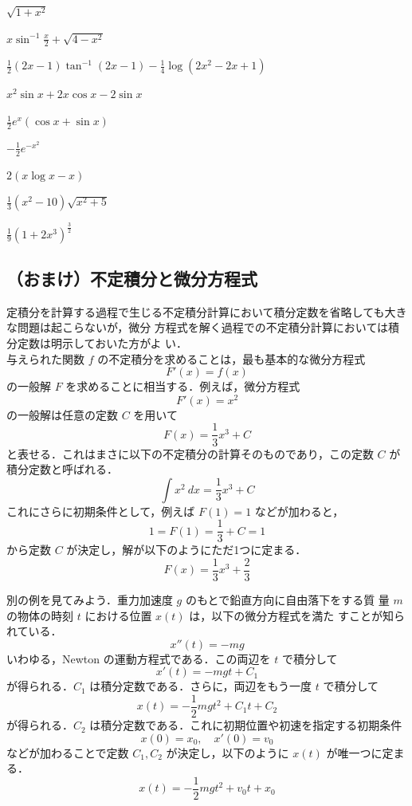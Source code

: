 \documentclass[10pt, uplatex, dvipdfmx]{jsarticle}
\theoremstyle{definition}
\numberwithin{equation}{section}
\newcommand{\ds}{\displaystyle}
\begin{document}
\begin{edaenumerate}
\item $\ds \sqrt{1+x^2}$

\item $\ds x\sin^{-1}\frac{x}{2} + \sqrt{4-x^2}$

\item<1> $\ds \frac{1}{2}\left(2x-1\right)\tan^{-1}\left(2x-1\right)-\frac{1}{4}\log \left(2x^2-2x+1\right)$ 

\item<2> $\ds x^2\sin x + 2x\cos x - 2 \sin x$

\item $\ds \frac{1}{2}e^x\left( \cos x + \sin x\right)$

\item $\ds -\frac{1}{2}e^{-x^2}$

\item $\ds 2 \left( x \log x - x\right)$

\item $\ds \frac{1}{3}\left(x^2-10 \right)\sqrt{x^2+5}$

\item $\ds \frac{1}{9} \left(1+2x^3\right)^{\frac{3}{2}}$

\end{edaenumerate}

\newpage

\subsection{（おまけ）不定積分と微分方程式}

定積分を計算する過程で生じる不定積分計算において積分定数を省略しても大きな問題は起こらないが，微分
方程式を解く過程での不定積分計算においては積分定数は明示しておいた方がよ
い．\\

与えられた関数 $f$ の不定積分を求めることは，最も基本的な微分方程式
\[
  F'(x) = f(x)
\]
の一般解 $F$ を求めることに相当する．例えば，微分方程式
\[
  F'(x) = x^2
\]
の一般解は任意の定数 $C$ を用いて
\[
  F(x) = \frac{1}{3}x^3 + C 
\]
と表せる．これはまさに以下の不定積分の計算そのものであり，この定数 $C$ が積分定数と呼ばれる．
\[
  \int x^2 \ dx = \frac{1}{3} x^3 +C
\]
これにさらに初期条件として，例えば $F(1) = 1$ などが加わると，
\[
  1=F(1) = \frac{1}{3}+C= 1
\]
から定数 $C$ が決定し，解が以下のようにただ1つに定まる．
\[
  F(x) = \frac{1}{3}x^3 + \frac{2}{3}
\]

別の例を見てみよう．重力加速度 $g$ のもとで鉛直方向に自由落下をする質
量 $m$ の物体の時刻 $t$ における位置 $x(t)$ は，以下の微分方程式を満た
すことが知られている．
\[
  x''(t) = -mg
\]
いわゆる，Newton の運動方程式である．この両辺を $t$ で積分して
\[
  x'(t) = -mg t +C_1
\]
が得られる．$C_1$ は積分定数である．さらに，両辺をもう一度 $t$ で積分して
\[
  x(t) = -\frac{1}{2}mg t^2 + C_1 t + C_2
\]
が得られる．$C_2$ は積分定数である．これに初期位置や初速を指定する初期条件
\[
  x(0) = x_0, \quad x'(0)= v_0
\]
などが加わることで定数 $C_1, C_2$ が決定し，以下のように $x(t)$ が唯一つに定まる．
\[
  x(t) = -\frac{1}{2}mg t^2 + v_0 t + x_0
\]
\end{document}
